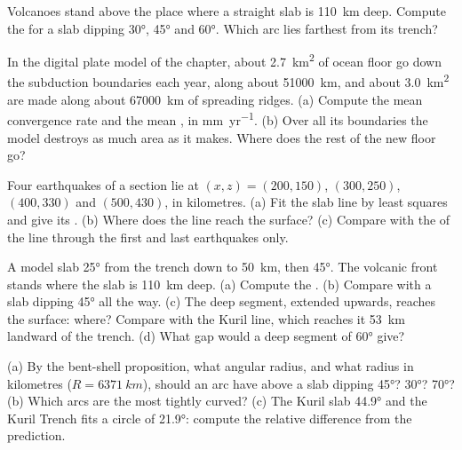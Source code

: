 \begin{exercise}[$\star$]\label{exo:b1:active-margins:3}
Volcanoes stand above the place where a straight slab is \qty{110}{km} deep.
Compute the  for a slab dipping \ang{30}, \ang{45} and
\ang{60}. Which arc lies farthest from its trench?
\end{exercise}

\begin{exercise}[$\star$]\label{exo:b1:active-margins:4}
In the digital plate model of the chapter, about \qty{2.7}{km^2} of ocean
floor go down the subduction boundaries each year, along about
\qty{51000}{km}, and about \qty{3.0}{km^2} are made along about
\qty{67000}{km} of spreading ridges. (a) Compute the mean convergence rate and
the mean , in \unit{mm.yr^{-1}}. (b) Over all its
boundaries the model destroys as much area as it makes. Where does the rest of
the new floor go?
\end{exercise}

\begin{exercise}[$\star\star$]\label{exo:b1:active-margins:5}
Four earthquakes of a section lie at $(x, z) = (200, 150)$, $(300, 250)$,
$(400, 330)$ and $(500, 430)$, in kilometres. (a) Fit the slab line by least
squares and give its . (b) Where does the line reach the surface? (c)
Compare with the  of the line through the first and last earthquakes only.
\end{exercise}

\begin{exercise}[$\star\star$]\label{exo:b1:active-margins:6}
A model slab  \ang{25} from the trench down to \qty{50}{km}, then
\ang{45}. The volcanic front stands where the slab is \qty{110}{km} deep. (a)
Compute the . (b) Compare with a slab dipping \ang{45} all the
way. (c) The deep segment, extended upwards, reaches the surface: where? Compare
with the Kuril line, which reaches it \qty{53}{km} landward of the trench. (d)
What gap would a deep segment of \ang{60} give?
\end{exercise}

\begin{exercise}[$\star\star$]\label{exo:b1:active-margins:7}
(a) By the bent-shell proposition, what angular radius, and what radius in
kilometres ($R = \qty{6371}{km}$), should an arc have above a slab dipping
\ang{45}? \ang{30}? \ang{70}? (b) Which arcs are the most tightly curved? (c)
The Kuril slab  \ang{44.9} and the Kuril Trench fits a circle of
\ang{21.9}: compute the relative difference from the prediction.
\end{exercise}

